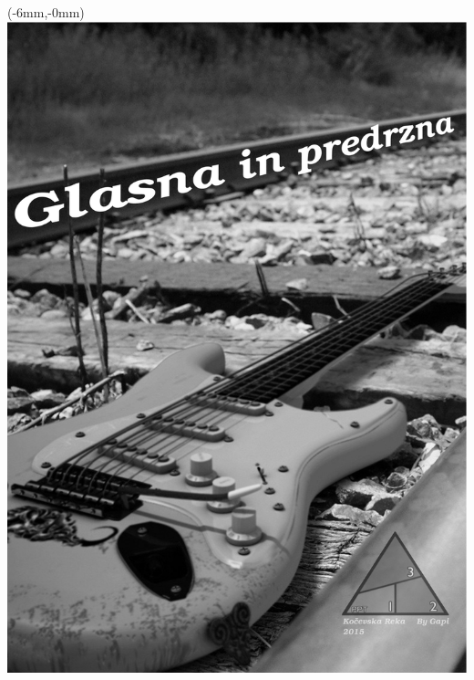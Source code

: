 \documentclass[a4paper,12pt]{article}
\begin{document}
\begin{titlepage}
\begin{textblock*}{297mm}(-6mm,-0mm)
\includegraphics[width=\paperwidth]{img/tpage.png}
\end{textblock*} \
\end{titlepage}
\setlength{\columnseprule}{0.5pt}
\begin{multicols}{2}
\tableofcontents
\end{multicols}
\pagebreak
\end{document}
